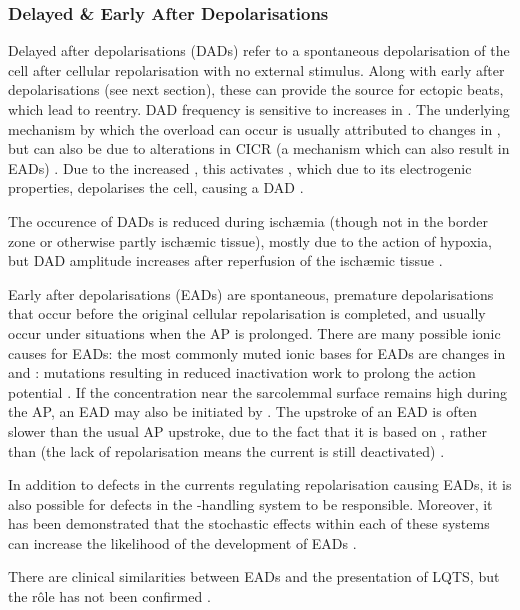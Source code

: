 \documentclass[../thesis-main.tex]{subfiles}
\begin{document}
\subsubsection{Delayed \& Early After Depolarisations}
\label{subsubsec:ead-dad}
Delayed after depolarisations (DADs) refer to a spontaneous depolarisation of the cell after cellular repolarisation with no external stimulus. Along with early after depolarisations (see next section), these can provide the source for ectopic beats, which lead to reentry. DAD frequency is sensitive to increases in \cai{}. The underlying mechanism by which the \cai{} overload can occur is usually attributed to changes in \ica{}, but can also be due to alterations in CICR (a mechanism which can also result in EADs) \citep{Volders1997}. Due to the increased \cai{}, this activates \inaca{}, which due to its electrogenic properties, depolarises the cell, causing a DAD \citep{Clusin2003}.

The occurence of DADs is reduced during isch\ae{}mia (though not in the border zone or otherwise partly isch\ae{}mic tissue), mostly due to the action of hypoxia, but DAD amplitude increases after reperfusion of the isch\ae{}mic tissue \citep{Coetzee1987, Ferrier1985}.

Early after depolarisations (EADs) are spontaneous, premature depolarisations that occur before the original cellular repolarisation is completed, and usually occur under situations when the AP is prolonged. There are many possible ionic causes for EADs: the most commonly muted ionic bases for EADs are changes in \ica{} and \ina{}: \ina{} mutations resulting in reduced inactivation work to prolong the action potential \citep{Clancy2005, Hashambhoy2011, Hiraoka1992}. If the \ca{} concentration near the sarcolemmal surface remains high during the AP, an EAD may also be initiated by \inaca{ } \citep{Volders1997}. The upstroke of an EAD is often slower than the usual AP upstroke, due to the fact that it is based on \ica{}, rather than \ina{} (the lack of repolarisation means the \ina{} current is still deactivated) \citep{Clusin2003}.

In addition to defects in the currents regulating repolarisation causing EADs, it is also possible for defects in the \ca{}-handling system to be responsible. Moreover, it has been demonstrated that the stochastic effects within each of these systems can increase the likelihood of the development of EADs \citep{Tanskanen2005, Sato2009, Heijman2013}.

There are clinical similarities between EADs and the presentation of LQTS, but the r\^ole has not been confirmed \citep{Clusin2003}.
\end{document}
